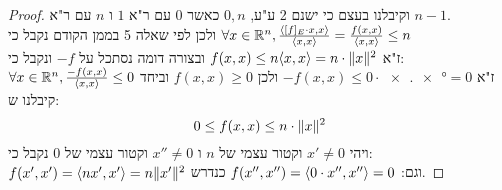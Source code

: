 \documentclass{article}
\begin{document}
\begin{proof}
            וקיבלנו בעצם כי ישנם 2 ע"ע, $0, n$ כאשר $0$ עם ר"א $1$ ו $n$ עם ר"א $n-1$. \\
            ולכן לפי שאלה 5 בממן הקודם נקבל כי \( \forall x \in \mathbb{R}^n, \frac{\langle [f]_E \cdot x, x \rangle}{\langle x,x \rangle} = \frac{f(x,x)}{\langle x,x \rangle} \leq n \) \\
            ז"א \( f(x,x) \leq n \langle x,x \rangle = n \cdot \lVert x \rVert^2 \)
            ובצורה דומה נסתכל על $-f$ ונקבל כי: \\
            \( \forall x \in \mathbb{R}^n, \frac{-f(x,x)}{\langle x,x \rangle} \leq 0 \)
            ז"א $-f(x,x) \leq 0 \cdot \ang{x,x} = 0$ ולכן $f(x,x) \geq 0$
            וביחד קיבלנו ש:
            \[
            0 \leq f(x,x) \leq n \cdot \lVert x \rVert^2
            \]
            ויהי $x' \neq 0$ וקטור עצמי של $n$ ו $x'' \neq 0$ וקטור עצמי של $0$ נקבל כי: \\
            \( f(x', x') = \langle nx', x' \rangle = n \lVert x' \rVert^2 \)
            וגם:
            \( f(x'', x'') = \langle 0 \cdot x'', x'' \rangle = 0 \) כנדרש.
    \end{proof}
\end{document}
